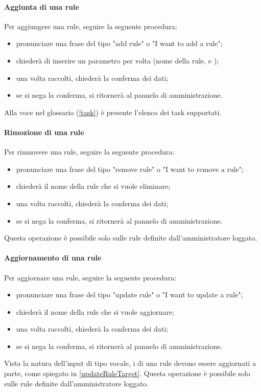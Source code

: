 \paragraph{Aggiunta di una rule}
Per aggiungere una rule, seguire la seguente procedura:
\begin{itemize}
	\item pronunciare una frase del tipo "add rule" o "I want to add a rule";
	\item \PROGETTO{} chiederà di inserire un parametro per volta (nome della rule,  e );
	\item una volta raccolti, \PROGETTO{} chiederà la conferma dei dati;
	\item se si nega la conferma, si ritornerà al pannelo di amministrazione.
\end{itemize}
Alla voce  nel glossario (\ref{task}) è presente l'elenco dei task supportati.
\paragraph{Rimozione di una rule}
Per rimuovere una rule, seguire la seguente procedura:
\begin{itemize}
	\item pronunciare una frase del tipo "remove rule" o "I want to remove a rule";
	\item \PROGETTO{} chiederà il nome della rule che si vuole eliminare;
	\item una volta raccolti, \PROGETTO{} chiederà la conferma dei dati;
	\item se si nega la conferma, si ritornerà al pannelo di amministrazione.
\end{itemize}
Questa operazione è possibile solo sulle rule definite dall'amministratore loggato.
\paragraph{Aggiornamento di una rule}
Per aggiornare una rule, seguire la seguente procedura:
\begin{itemize}
	\item pronunciare una frase del tipo "update rule" o "I want to update a rule";
	\item \PROGETTO{} chiederà il nome della rule che si vuole aggiornare;
	\item una volta raccolti, \PROGETTO{} chiederà la conferma dei dati;
	\item se si nega la conferma, si ritornerà al pannelo di amministrazione.
\end{itemize}
Vista la natura dell'input di tipo vocale, i  di una rule devono essere aggiornati a parte, come spiegato in \ref{updateRuleTarget}.
Questa operazione è possibile solo sulle rule definite dall'amministratore loggato.
